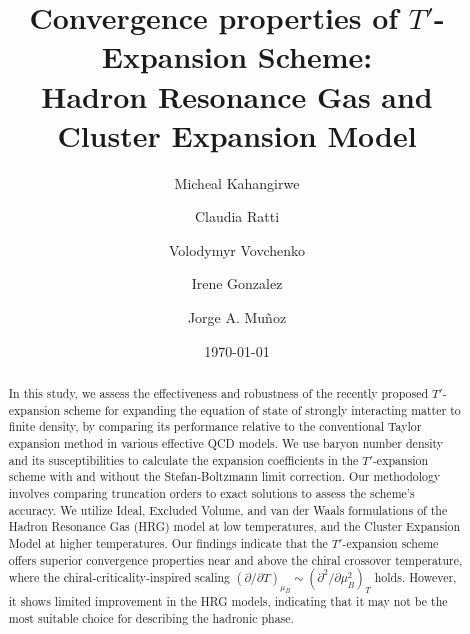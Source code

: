 \documentclass[%
 reprint,
nofootinbib,
 amsmath,amssymb,
 aps,
prc
]{revtex4-2}
\begin{document}

\title{Convergence properties of $T'$-Expansion Scheme:\\ Hadron Resonance Gas and Cluster Expansion Model}%

\author{Micheal Kahangirwe}
 \author{Claudia Ratti}%
\author{Volodymyr Vovchenko}%
%
\author{Irene Gonzalez} 
\author{Jorge A. Muñoz}
%


\date{\today}%

\begin{abstract}

In this study, we assess the effectiveness and robustness of the recently proposed $T'$-expansion scheme for expanding the equation of state of strongly interacting matter to finite density, by comparing its performance relative to the conventional Taylor expansion method in various effective QCD models.
We use baryon number density and its susceptibilities to calculate the expansion coefficients in the $T'$-expansion scheme with and without the Stefan-Boltzmann limit correction.
Our methodology involves comparing truncation orders to exact solutions to assess the scheme’s accuracy.
We utilize Ideal, Excluded Volume, and van der Waals formulations of the Hadron Resonance Gas (HRG) model at low temperatures, and the Cluster Expansion Model at higher temperatures.
Our findings indicate that the $T'$-expansion scheme offers superior convergence properties near and above the chiral crossover temperature, where the chiral-criticality-inspired scaling $(\partial/ \partial T)_{\mu_B} \sim (\partial^2/\partial \mu_B^2)_T$ holds. 
However, it shows limited improvement in the HRG models, indicating that it may not be the most suitable choice for describing the hadronic phase. 
\end{abstract}
\maketitle
\end{document}
